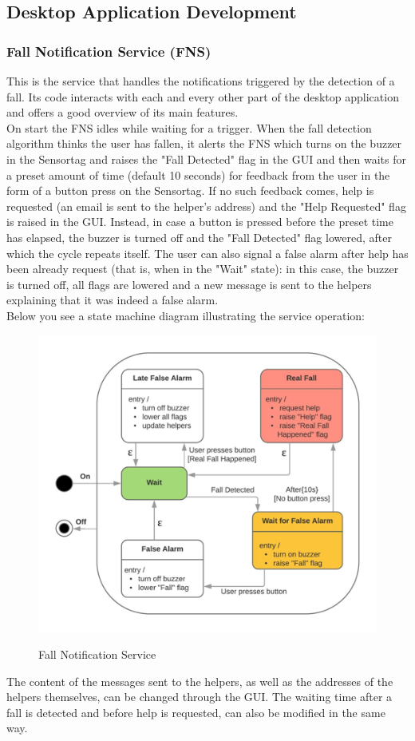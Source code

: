\documentclass[conference,12pt]{IEEETran}
\begin{document}
\subsection{Desktop Application Development}
\subsubsection{Fall Notification Service (FNS)}
This is the service that handles the notifications triggered by the detection of a fall. Its code interacts with each and every other part of the desktop application and offers a good overview of its main features.\\
On start the FNS idles while waiting for a trigger. When the fall detection algorithm thinks the user has fallen, it alerts the FNS which turns on the buzzer in the Sensortag and raises the "Fall Detected" flag in the GUI and then waits for a preset amount of time (default 10 seconds) for feedback from the user in the form of a button press on the Sensortag. If no such feedback comes, help is requested (an email is sent to the helper’s address) and the "Help Requested" flag is raised in the GUI. Instead, in case a button is pressed before the preset time has elapsed, the buzzer is turned off and the "Fall Detected" flag lowered, after which the cycle repeats itself. The user can also signal a false alarm after help has been already request (that is, when in the "Wait" state): in this case, the buzzer is turned off, all flags are lowered and a new message is sent to the helpers explaining that it was indeed a false alarm.\\
Below you see a state machine diagram illustrating the service operation:
\FloatBarrier
\begin{figure}[!h]
	\centering
	\caption{Fall Notification Service}
	\includegraphics[scale=0.6]{images/FNS.png}
	\label{img:FNS}
\end{figure}
\FloatBarrier
The content of the messages sent to the helpers, as well as the addresses of the helpers themselves, can be changed through the GUI. The waiting time after a fall is detected and before help is requested, can also be modified in the same way.
\end{document}
